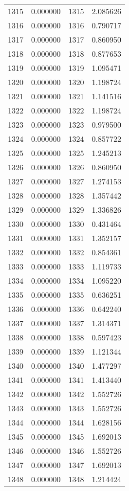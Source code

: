 \documentclass[12pt]{article}
\begin{document}
\begin{longtable}{@{}cccc@{}}
1315 & 0.000000 & 1315 & 2.085626 \\
1316 & 0.000000 & 1316 & 0.790717 \\
1317 & 0.000000 & 1317 & 0.860950 \\
1318 & 0.000000 & 1318 & 0.877653 \\
1319 & 0.000000 & 1319 & 1.095471 \\
1320 & 0.000000 & 1320 & 1.198724 \\
1321 & 0.000000 & 1321 & 1.141516 \\
1322 & 0.000000 & 1322 & 1.198724 \\
1323 & 0.000000 & 1323 & 0.979500 \\
1324 & 0.000000 & 1324 & 0.857722 \\
1325 & 0.000000 & 1325 & 1.245213 \\
1326 & 0.000000 & 1326 & 0.860950 \\
1327 & 0.000000 & 1327 & 1.274153 \\
1328 & 0.000000 & 1328 & 1.357442 \\
1329 & 0.000000 & 1329 & 1.336826 \\
1330 & 0.000000 & 1330 & 0.431464 \\
1331 & 0.000000 & 1331 & 1.352157 \\
1332 & 0.000000 & 1332 & 0.854361 \\
1333 & 0.000000 & 1333 & 1.119733 \\
1334 & 0.000000 & 1334 & 1.095220 \\
1335 & 0.000000 & 1335 & 0.636251 \\
1336 & 0.000000 & 1336 & 0.642240 \\
1337 & 0.000000 & 1337 & 1.314371 \\
1338 & 0.000000 & 1338 & 0.597423 \\
1339 & 0.000000 & 1339 & 1.121344 \\
1340 & 0.000000 & 1340 & 1.477297 \\
1341 & 0.000000 & 1341 & 1.413440 \\
1342 & 0.000000 & 1342 & 1.552726 \\
1343 & 0.000000 & 1343 & 1.552726 \\
1344 & 0.000000 & 1344 & 1.628156 \\
1345 & 0.000000 & 1345 & 1.692013 \\
1346 & 0.000000 & 1346 & 1.552726 \\
1347 & 0.000000 & 1347 & 1.692013 \\
1348 & 0.000000 & 1348 & 1.214424 \\

\end{longtable}
\end{document}
